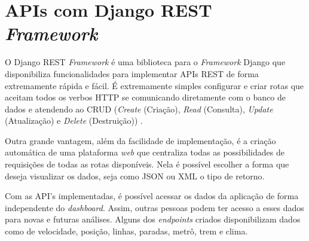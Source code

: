 \section{APIs com Django REST \textit{Framework}}
\indent
\par O Django REST \textit{Framework} é uma biblioteca para o \textit{Framework} Django que disponibiliza funcionalidades para implementar APIs REST de forma extremamente rápida e fácil. É extremamente simples configurar e criar rotas que aceitam todos os verbos HTTP se comunicando diretamente com o banco de dados e atendendo ao CRUD (\textit{Create} (Criação), \textit{Read} (Consulta), \textit{Update} (Atualização) e \textit{Delete} (Destruição)) \cite{Estevao2016}.
\indent
\par Outra grande vantagem, além da facilidade de implementação, é a criação automática de uma plataforma \textit{web} que centraliza todas as possibilidades de requisições de todas as rotas disponíveis. Nela é possível escolher a forma que deseja visualizar os dados, seja como JSON ou XML o tipo de retorno.
\indent
\par Com as API’s implementadas, é possível acessar os dados da aplicação de forma independente do \textit{dashboard}. Assim, outras pessoas podem ter acesso a esses dados para novas e futuras análises. Alguns dos \textit{endpoints} criados disponibilizam dados como de velocidade, posição, linhas, paradas, metrô, trem e clima.

